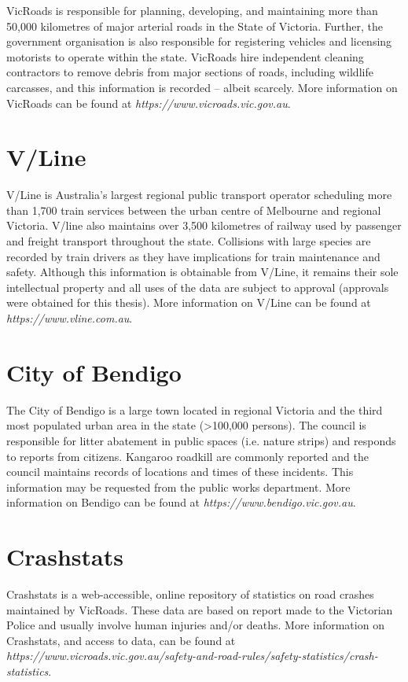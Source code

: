 VicRoads is responsible for planning, developing, and maintaining more than 50,000 kilometres of major arterial roads in the State of Victoria. Further, the government organisation is also responsible for registering vehicles and licensing motorists to operate within the state. VicRoads hire independent cleaning contractors to remove debris from major sections of roads, including wildlife carcasses, and this information is recorded -- albeit scarcely. More information on VicRoads can be found at \textit{https://www.vicroads.vic.gov.au}.

\section{V/Line}

V/Line is Australia's largest regional public transport operator scheduling more than 1,700 train services between the urban centre of Melbourne and regional Victoria. V/line also maintains over 3,500 kilometres of railway used by passenger and freight transport throughout the state. Collisions with large species are recorded by train drivers as they have implications for train maintenance and safety. Although this information is obtainable from V/Line, it remains their sole intellectual property and all uses of the data are subject to approval (approvals were obtained for this thesis). More information on V/Line can be found at \textit{https://www.vline.com.au}.

\section{City of Bendigo}

The City of Bendigo is a large town located in regional Victoria and the third most populated urban area in the state (>100,000 persons). The council is responsible for litter abatement in public spaces (i.e. nature strips) and responds to reports from citizens. Kangaroo roadkill are commonly reported and the council maintains records of locations and times of these incidents. This information may be requested from the public works department. More information on Bendigo can be found at \textit{https://www.bendigo.vic.gov.au}.

\section{Crashstats}

Crashstats is a web-accessible, online repository of statistics on road crashes maintained by VicRoads. These data are based on report made to the Victorian Police and usually involve human injuries and/or deaths. More information on Crashstats, and access to data, can be found at \textit{https://www.vicroads.vic.gov.au/safety-and-road-rules/safety-statistics/crash-statistics}.


